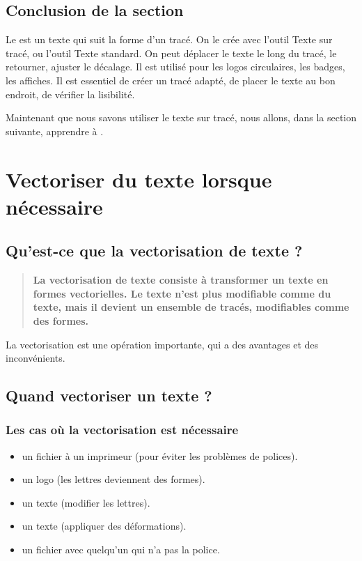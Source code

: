 \subsection*{Conclusion de la section}

Le  est un texte qui suit la forme d'un tracé. On le crée avec l'outil Texte sur tracé, ou l'outil Texte standard. On peut déplacer le texte le long du tracé, le retourner, ajuster le décalage. Il est utilisé pour les logos circulaires, les badges, les affiches. Il est essentiel de créer un tracé adapté, de placer le texte au bon endroit, de vérifier la lisibilité.

Maintenant que nous savons utiliser le texte sur tracé, nous allons, dans la section suivante, apprendre à .

\section{Vectoriser du texte lorsque nécessaire}

\subsection{Qu'est-ce que la vectorisation de texte ?}

\begin{quote}
\textbf{La vectorisation de texte consiste à transformer un texte en formes vectorielles. Le texte n'est plus modifiable comme du texte, mais il devient un ensemble de tracés, modifiables comme des formes.}
\end{quote}

La vectorisation est une opération importante, qui a des avantages et des inconvénients.

\subsection{Quand vectoriser un texte ?}

\subsubsection{Les cas où la vectorisation est nécessaire}

\begin{itemize}
    \item {} un fichier à un imprimeur (pour éviter les problèmes de polices).
    \item {} un logo (les lettres deviennent des formes).
    \item {} un texte (modifier les lettres).
    \item {} un texte (appliquer des déformations).
    \item {} un fichier avec quelqu'un qui n'a pas la police.
\end{itemize}

